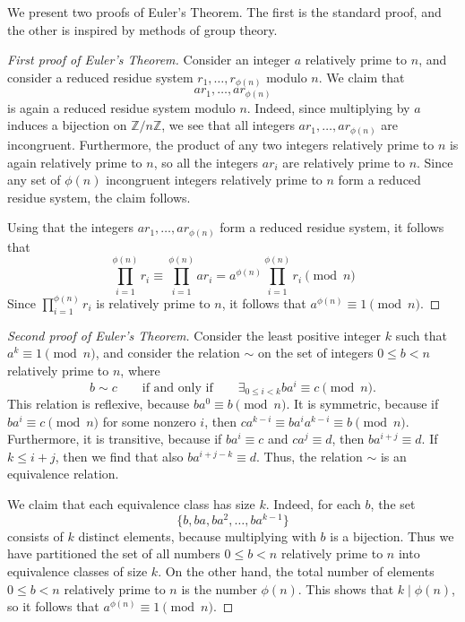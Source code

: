 We present two proofs of Euler's Theorem. The first is the standard proof, and the other is inspired by methods of group theory.

\begin{proof}[First proof of Euler's Theorem]
  Consider an integer $a$ relatively prime to $n$, and consider a reduced residue system $r_1,\ldots,r_{\phi(n)}$ modulo $n$. We claim that
  \begin{equation*}
    ar_1,\ldots,ar_{\phi(n)}
  \end{equation*}
  is again a reduced residue system modulo $n$. Indeed, since multiplying by $a$ induces a bijection on $\mathbb{Z}/n\mathbb{Z}$, we see that all integers $ar_1,\ldots,ar_{\phi(n)}$ are incongruent. Furthermore, the product of any two integers relatively prime to $n$ is again relatively prime to $n$, so all the integers $ar_i$ are relatively prime to $n$. Since any set of $\phi(n)$ incongruent integers relatively prime to $n$ form a reduced residue system, the claim follows.

  Using that the integers $ar_1,\ldots,ar_{\phi(n)}$ form a reduced residue system, it follows that
  \begin{equation*}
    \prod_{i=1}^{\phi(n)}r_i\equiv \prod_{i=1}^{\phi(n)}ar_i = a^{\phi(n)}\prod_{i=1}^{\phi(n)}r_i\pmod{n}
  \end{equation*}
  Since $\prod_{i=1}^{\phi(n)}r_i$ is relatively prime to $n$, it follows that $a^{\phi(n)}\equiv 1\pmod{n}$.
\end{proof}

\begin{proof}[Second proof of Euler's Theorem]
  Consider the least positive integer $k$ such that $a^k\equiv 1\pmod{n}$, and consider the relation $\sim$ on the set of integers $0\leq b<n$ relatively prime to $n$, where
  \begin{equation*}
    b\sim c \qquad\text{if and only if}\qquad \exists_{0\leq i< k} ba^i\equiv c\pmod{n}.
  \end{equation*}
  This relation is reflexive, because $ba^0 \equiv b\pmod{n}$. It is symmetric, because if $ba^i\equiv c\pmod{n}$ for some nonzero $i$, then $ca^{k-i}\equiv ba^ia^{k-i}\equiv b\pmod{n}$. Furthermore, it is transitive, because if $ba^i\equiv c$ and $ca^j\equiv d$, then $ba^{i+j}\equiv d$. If $k\leq i+j$, then we find that also $ba^{i+j-k}\equiv d$. Thus, the relation $\sim$ is an equivalence relation.

  We claim that each equivalence class has size $k$. Indeed, for each $b$, the set
  \begin{equation*}
    \{b,ba,ba^2,\ldots,ba^{k-1}\}
  \end{equation*}
  consists of $k$ distinct elements, because multiplying with $b$ is a bijection. Thus we have partitioned the set of all numbers $0\leq b<n$ relatively prime to $n$ into equivalence classes of size $k$. On the other hand, the total number of elements $0\leq b<n$ relatively prime to $n$ is the number $\phi(n)$. This shows that $k\mid \phi(n)$, so it follows that $a^{\phi(n)}\equiv 1\pmod{n}$.
\end{proof}

